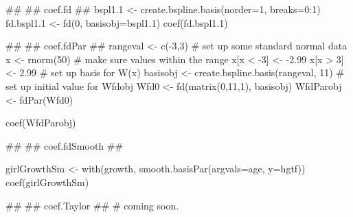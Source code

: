 \documentclass{article}
\begin{document}
\begin{Examples}
\begin{ExampleCode}
##
## coef.fd
##
bspl1.1 <- create.bspline.basis(norder=1, breaks=0:1)
fd.bspl1.1 <- fd(0, basisobj=bspl1.1)
coef(fd.bspl1.1)


##
## coef.fdPar 
##
rangeval <- c(-3,3)
#  set up some standard normal data
x <- rnorm(50)
#  make sure values within the range
x[x < -3] <- -2.99
x[x >  3] <-  2.99
#  set up basis for W(x)
basisobj <- create.bspline.basis(rangeval, 11)
#  set up initial value for Wfdobj
Wfd0 <- fd(matrix(0,11,1), basisobj)
WfdParobj <- fdPar(Wfd0)

coef(WfdParobj)


##
## coef.fdSmooth
##

girlGrowthSm <- with(growth, smooth.basisPar(argvals=age, y=hgtf))
coef(girlGrowthSm)


##
## coef.Taylor 
##
# coming soon.

\end{ExampleCode}
\end{Examples}
\end{document}
